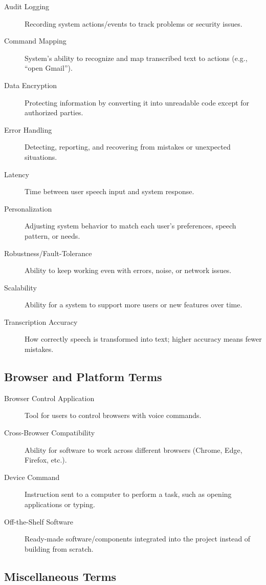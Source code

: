 \documentclass[11pt]{article}
\begin{document}
\begin{description}
  \item[Audit Logging] Recording system actions/events to track problems or security issues.
  \item[Command Mapping] System’s ability to recognize and map transcribed text to actions (e.g., “open Gmail”).
  \item[Data Encryption] Protecting information by converting it into unreadable code except for authorized parties.
  \item[Error Handling] Detecting, reporting, and recovering from mistakes or unexpected situations.
  \item[Latency] Time between user speech input and system response.
  \item[Personalization] Adjusting system behavior to match each user’s preferences, speech pattern, or needs.
  \item[Robustness/Fault-Tolerance] Ability to keep working even with errors, noise, or network issues.
  \item[Scalability] Ability for a system to support more users or new features over time.
  \item[Transcription Accuracy] How correctly speech is transformed into text; higher accuracy means fewer mistakes.
\end{description}

\subsection*{Browser and Platform Terms}

\begin{description}
  \item[Browser Control Application] Tool for users to control browsers with voice commands.
  \item[Cross-Browser Compatibility] Ability for software to work across different browsers (Chrome, Edge, Firefox, etc.).
  \item[Device Command] Instruction sent to a computer to perform a task, such as opening applications or typing.
  \item[Off-the-Shelf Software] Ready-made software/components integrated into the project instead of building from scratch.
\end{description}

\subsection*{Miscellaneous Terms}
\end{document}
